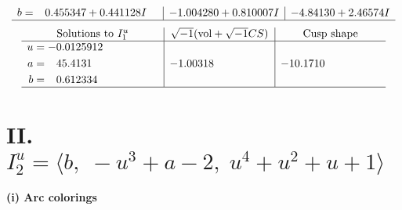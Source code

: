 \documentclass[1p]{elsarticle_modified}
\theoremstyle{definition}
\newcommand{\I}{\sqrt{-1}}
\begin{document}
$$\begin{array}{c|c|c}
\begin{aligned}
b &= \phantom{-}0.455347 + 0.441128 I\end{aligned}
 & -1.004280 + 0.810007 I & -4.84130 + 2.46574 I\\
 \hline 
 \end{array}$$\newpage$$\begin{array}{c|c|c}  
\text{Solutions to }I^u_{1}& \I (\text{vol} + \sqrt{-1}CS) & \text{Cusp shape}\\
 \hline 
\begin{aligned}
u &= -0.0125912\phantom{ +0.000000I} \\
a &= \phantom{-}45.4131\phantom{ +0.000000I} \\
b &= \phantom{-}0.612334\phantom{ +0.000000I}\end{aligned}
 & -1.00318\phantom{ +0.000000I} & -10.1710\phantom{ +0.000000I}\\
 \hline 
 \end{array}$$\newpage\newpage\renewcommand{\arraystretch}{1}
\centering \section*{II. $I^u_{2}= \langle b,\;- u^3+a-2,\;u^4+u^2+u+1 \rangle$}
\flushleft \textbf{(i) Arc colorings}\\
\end{document}
